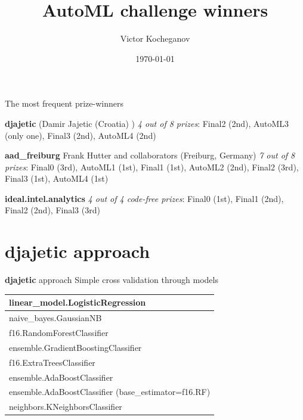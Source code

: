 \documentclass[12pt]{beamer}
\begin{document}
\title{AutoML challenge winners}
\author{Victor Kocheganov}
\date{\today} 

\begin{frame}
\titlepage
\end{frame}

\begin{frame}{The most frequent prize-winners}

\begin{block}{\textbf{djajetic} (Damir Jajetic (Croatia) )}
\textit{4 out of 8 prizes}: Final2 (2nd), AutoML3 (only one), Final3 (2nd), AutoML4 (2nd)
\end{block}
\pause
\begin{block}{\textbf{aad\_freiburg} Frank Hutter and collaborators (Freiburg, Germany)}
\textit{7 out of 8 prizes}: Final0 (3rd), AutoML1 (1st), Final1 (1st), AutoML2 (2nd), Final2 (3rd), Final3 (1st), AutoML4 (1st)
\end{block}
\pause
\begin{block}{\textbf{ideal.intel.analytics}}
\textit{4 out of 4 code-free prizes}: Final0 (1st), Final1 (2nd), Final2 (2nd), Final3 (3rd)
\end{block}

\end{frame}


\section{djajetic approach}
\begin{frame}{\textbf{djajetic} approach}
Simple cross validation through models
\small

\begin{tabular}{|l|}
\hline
linear\_model.LogisticRegression \\ \hline
naive\_bayes.GaussianNB \\ \hline
f16.RandomForestClassifier\\ \hline
ensemble.GradientBoostingClassifier \\ \hline
f16.ExtraTreesClassifier \\ \hline
ensemble.AdaBoostClassifier \\ \hline
ensemble.AdaBoostClassifier (base\_estimator=f16.RF) \\ \hline
neighbors.KNeighborsClassifier \\ \hline
\end{tabular}
\end{frame}
\end{document}

